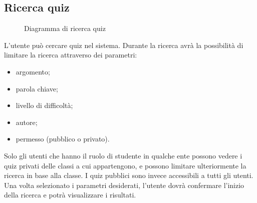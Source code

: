 \documentclass[a4paper, titlepage]{article}
\begin{document}
\subsection{Ricerca quiz}
\begin{figure}[H]
	\centering
	\noindent{}
	\caption{Diagramma di ricerca quiz}
\end{figure}
L’utente può cercare quiz nel sistema. Durante la ricerca avrà la possibilità di limitare la ricerca attraverso dei parametri: 
\begin{itemize}
	\item argomento;
	\item parola chiave; 
	\item livello di difficoltà; 
	\item autore;
	\item permesso (pubblico o privato). 
\end{itemize}
Solo gli utenti che hanno il ruolo di studente in qualche ente possono vedere i quiz privati delle classi a cui appartengono, e possono limitare ulteriormente la ricerca in base alla classe. I quiz pubblici sono invece accessibili a tutti gli utenti. Una volta selezionato i parametri desiderati, l’utente dovrà confermare l’inizio della ricerca e potrà visualizzare i risultati. 
\end{document}

